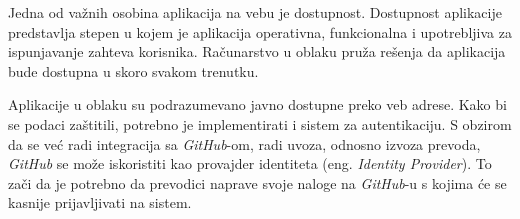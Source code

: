 Jedna od važnih osobina aplikacija na vebu je dostupnost. Dostupnost aplikacije predstavlja stepen u kojem je 
aplikacija operativna, funkcionalna i upotrebljiva za ispunjavanje zahteva korisnika. 
Računarstvo u oblaku pruža rešenja da aplikacija bude dostupna u skoro svakom trenutku.

Aplikacije u oblaku su podrazumevano javno dostupne preko veb adrese. Kako bi se podaci zaštitili,
potrebno je implementirati i sistem za autentikaciju. S obzirom da se već radi integracija sa \textit{GitHub}-om, radi
uvoza, odnosno izvoza prevoda, \textit{GitHub} se može iskoristiti kao provajder identiteta (eng. \textit{Identity Provider}).
To zači da je potrebno da prevodici naprave svoje naloge na \textit{GitHub}-u s kojima će se kasnije prijavljivati 
na sistem.